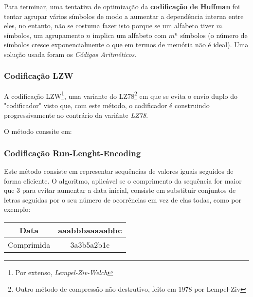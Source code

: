 \documentclass[11pt,journal,compsoc]{IEEEtran}
\begin{document}
Para terminar, uma tentativa de optimização da \textbf{codificação de Huffman} foi tentar agrupar vários símbolos de modo a aumentar a dependência interna entre eles, no entanto, não se costuma fazer isto porque se um alfabeto tiver $m$ símbolos, um agrupamento $n$ implica um alfabeto com $m^n$ símbolos (o número de símbolos cresce exponencialmente o que em termos de memória não é ideal). Uma solução usada foram os \textit{Códigos Aritméticos}.


\subsubsection{Codificação \textbf{LZW}}
A codificação LZW\footnote{Por extenso, \textit{Lempel-Ziv-Welch}}, uma variante do LZ78\footnote{Outro método de compressão não destrutivo, feito em 1978 por Lempel-Ziv} em que se evita o envio duplo do "codificador" visto que, com este método, o codificador é construindo progressivamente ao contrário da variânte \textit{LZ78}.

O método conssite em:




\subsubsection{Codificação \textbf{Run-Lenght-Encoding}}
Este método consiste em representar sequências de valores iguais seguidos de forma eficiente. O algoritmo, aplicável se o comprimento da sequência for maior que 3 para evitar aumentar a data inicial, consiste em substituir conjuntos de letras seguidas por o seu número de ocorrências em vez de elas todas, como por exemplo:

\begin{center}
\begin{tabular}{ |c|c| } 
  \hline
  Data & aaabbbaaaaabbc \\
  \hline
  Comprimida & 3a3b5a2b1c \\
  \hline
\end{tabular}
\end{center}
\end{document}
